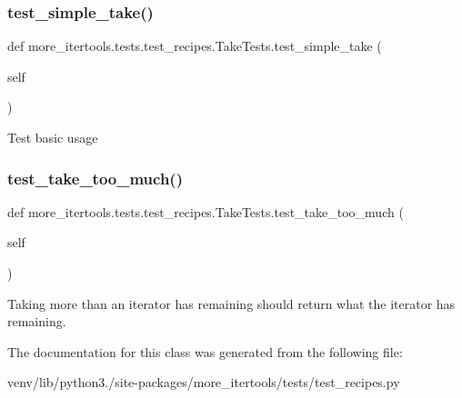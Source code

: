 \subsubsection{\texorpdfstring{test\+\_\+simple\+\_\+take()}{test\_simple\_take()}}
{\footnotesize\ttfamily def more\+\_\+itertools.\+tests.\+test\+\_\+recipes.\+Take\+Tests.\+test\+\_\+simple\+\_\+take (\begin{DoxyParamCaption}\item[{}]{self }\end{DoxyParamCaption})}

\begin{DoxyVerb}Test basic usage\end{DoxyVerb}
 \mbox{\label{classmore__itertools_1_1tests_1_1test__recipes_1_1_take_tests_a48e86ce8a8ee977dedc09c5c78a8766c}} 
\subsubsection{\texorpdfstring{test\+\_\+take\+\_\+too\+\_\+much()}{test\_take\_too\_much()}}
{\footnotesize\ttfamily def more\+\_\+itertools.\+tests.\+test\+\_\+recipes.\+Take\+Tests.\+test\+\_\+take\+\_\+too\+\_\+much (\begin{DoxyParamCaption}\item[{}]{self }\end{DoxyParamCaption})}

\begin{DoxyVerb}Taking more than an iterator has remaining should return what the
iterator has remaining.\end{DoxyVerb}
 

The documentation for this class was generated from the following file\+:\begin{DoxyCompactItemize}
\item 
venv/lib/python3./site-\/packages/more\+\_\+itertools/tests/test\+\_\+recipes.\+py\end{DoxyCompactItemize}
